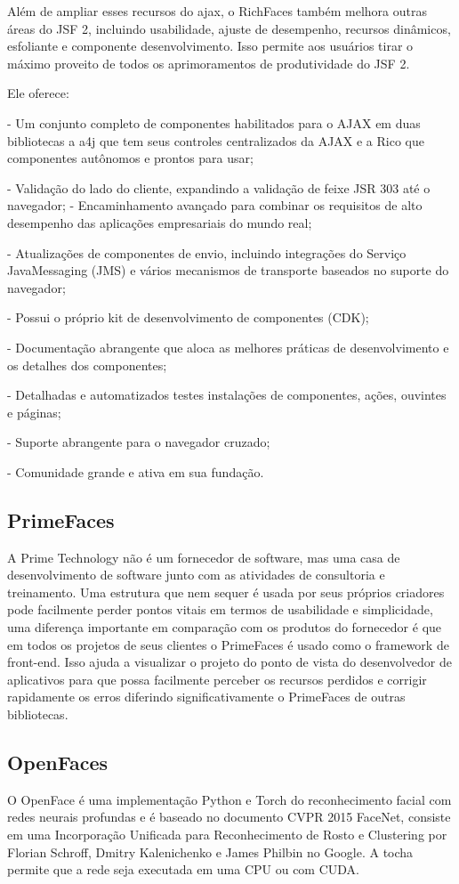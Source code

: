 \documentclass[12pt,a4paper]{article}
\begin{document}
Além de ampliar esses recursos do ajax, o RichFaces também melhora outras áreas do JSF 2, incluindo usabilidade, ajuste de desempenho, recursos dinâmicos, esfoliante e componente desenvolvimento. Isso permite aos usuários tirar o máximo proveito de todos os aprimoramentos de produtividade do JSF 2. 

Ele oferece:

- Um conjunto completo de componentes habilitados para o AJAX em duas bibliotecas a a4j que tem seus controles centralizados da AJAX e a Rico que componentes autônomos e prontos para usar;

- Validação do lado do cliente, expandindo a validação de feixe JSR 303 até o navegador;
- Encaminhamento avançado para combinar os requisitos de alto desempenho das aplicações empresariais do mundo real;

- Atualizações de componentes de envio, incluindo integrações do Serviço JavaMessaging (JMS) e vários mecanismos de transporte baseados no suporte do navegador;

- Possui o próprio kit de desenvolvimento de componentes (CDK);

- Documentação abrangente que aloca as melhores práticas de desenvolvimento e os detalhes dos componentes;

- Detalhadas e automatizados testes instalações de componentes, ações, ouvintes e páginas;

- Suporte abrangente para o navegador cruzado;

- Comunidade grande e ativa em sua fundação.

\subsection{PrimeFaces}
A Prime Technology não é um fornecedor de software, mas uma casa de desenvolvimento de software junto com as atividades de consultoria e treinamento. Uma estrutura que nem sequer é usada por seus próprios criadores pode facilmente perder pontos vitais em termos de usabilidade e simplicidade, uma diferença importante em comparação com os produtos do fornecedor é que em todos os projetos de seus clientes o PrimeFaces é usado como o framework de front-end. Isso ajuda a visualizar o projeto do ponto de vista do desenvolvedor de aplicativos para que possa facilmente perceber os recursos perdidos e corrigir rapidamente os erros diferindo significativamente o PrimeFaces de outras bibliotecas.

\subsection{OpenFaces}
O OpenFace é uma implementação Python e Torch do reconhecimento facial com redes neurais profundas e é baseado no documento CVPR 2015 FaceNet, consiste em uma Incorporação Unificada para Reconhecimento de Rosto e Clustering por Florian Schroff, Dmitry Kalenichenko e James Philbin no Google. A tocha permite que a rede seja executada em uma CPU ou com CUDA. 
\end{document}
